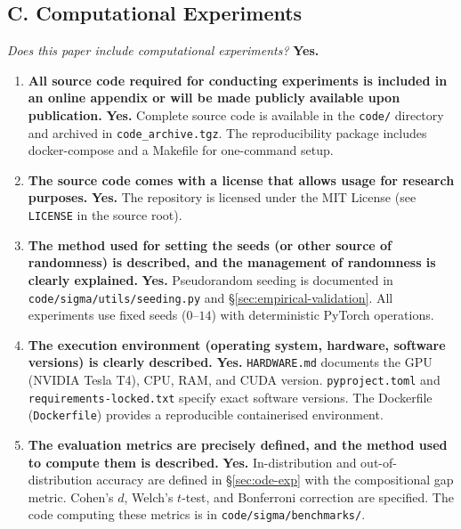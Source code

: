 \documentclass[10pt]{article}
\begin{document}
\subsection*{C. Computational Experiments}
\noindent\textit{Does this paper include computational experiments?} \textbf{Yes.}

\begin{enumerate}
  \item \textbf{All source code required for conducting experiments is included in
    an online appendix or will be made publicly available upon publication.}
    \textbf{Yes.} Complete source code is available in the \texttt{code/}
    directory and archived in \texttt{code\_archive.tgz}. The reproducibility
    package includes docker-compose and a Makefile for one-command setup.

  \item \textbf{The source code comes with a license that allows usage for research purposes.}
    \textbf{Yes.} The repository is licensed under the MIT License
    (see \texttt{LICENSE} in the source root).

  \item \textbf{The method used for setting the seeds (or other source of randomness)
    is described, and the management of randomness is clearly explained.}
    \textbf{Yes.} Pseudorandom seeding is documented in
    \texttt{code/}\allowbreak\texttt{sigma/}\allowbreak\texttt{utils/}\allowbreak\texttt{seeding.py}
    and \S\ref{sec:empirical-validation}. All experiments use fixed seeds
    ($0$--$14$) with deterministic PyTorch operations.

  \item \textbf{The execution environment (operating system, hardware, software
    versions) is clearly described.}
    \textbf{Yes.} \texttt{HARDWARE.md} documents the GPU (NVIDIA Tesla T4),
    CPU, RAM, and CUDA version. \texttt{pyproject.toml} and
    \texttt{requirements-locked.txt} specify exact software versions.
    The Dockerfile (\texttt{Dockerfile}) provides a reproducible
    containerised environment.

  \item \textbf{The evaluation metrics are precisely defined, and the method used
    to compute them is described.}
    \textbf{Yes.} In-distribution and out-of-distribution accuracy are
    defined in \S\ref{sec:ode-exp} with the compositional gap metric.
    Cohen's $d$, Welch's $t$-test, and Bonferroni correction are
    specified. The code computing these metrics is in
    \texttt{code/sigma/benchmarks/}.


\end{enumerate}
\end{document}
